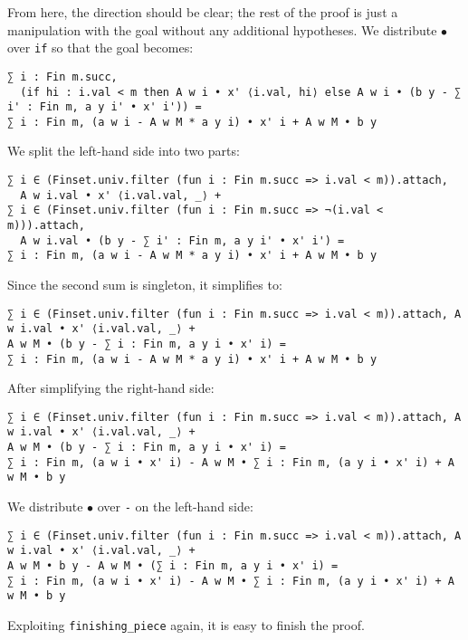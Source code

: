 \documentclass[]{article}
\renewcommand{\.}{\hskip .75pt}
\begin{document}
From here, the direction should be clear; the rest of the proof is just a manipulation
with the goal without any additional hypotheses.
We distribute $\bullet$ over \texttt{if} so that the goal becomes:
\begin{lstlisting}
∑ i : Fin m.succ,
  (if hi : i.val < m then A w i • x' ⟨i.val, hi⟩ else A w i • (b y - ∑ i' : Fin m, a y i' • x' i')) =
∑ i : Fin m, (a w i - A w M * a y i) • x' i + A w M • b y
\end{lstlisting}
We split the left-hand side into two parts:
\begin{lstlisting}
∑ i ∈ (Finset.univ.filter (fun i : Fin m.succ => i.val < m)).attach, 
  A w i.val • x' ⟨i.val.val, _⟩ +
∑ i ∈ (Finset.univ.filter (fun i : Fin m.succ => ¬(i.val < m))).attach, 
  A w i.val • (b y - ∑ i' : Fin m, a y i' • x' i') =
∑ i : Fin m, (a w i - A w M * a y i) • x' i + A w M • b y
\end{lstlisting}
Since the second sum is singleton, it simplifies to:
\begin{lstlisting}
∑ i ∈ (Finset.univ.filter (fun i : Fin m.succ => i.val < m)).attach, A w i.val • x' ⟨i.val.val, _⟩ +
A w M • (b y - ∑ i : Fin m, a y i • x' i) =
∑ i : Fin m, (a w i - A w M * a y i) • x' i + A w M • b y
\end{lstlisting}
After simplifying the right-hand side:
\begin{lstlisting}
∑ i ∈ (Finset.univ.filter (fun i : Fin m.succ => i.val < m)).attach, A w i.val • x' ⟨i.val.val, _⟩ +
A w M • (b y - ∑ i : Fin m, a y i • x' i) =
∑ i : Fin m, (a w i • x' i) - A w M • ∑ i : Fin m, (a y i • x' i) + A w M • b y
\end{lstlisting}
We distribute $\bullet$ over \texttt{-} on the left-hand side:
\begin{lstlisting}
∑ i ∈ (Finset.univ.filter (fun i : Fin m.succ => i.val < m)).attach, A w i.val • x' ⟨i.val.val, _⟩ +
A w M • b y - A w M • (∑ i : Fin m, a y i • x' i) =
∑ i : Fin m, (a w i • x' i) - A w M • ∑ i : Fin m, (a y i • x' i) + A w M • b y
\end{lstlisting}
Exploiting \texttt{finishing\_piece} again, it is easy to finish the proof.
\end{document}

